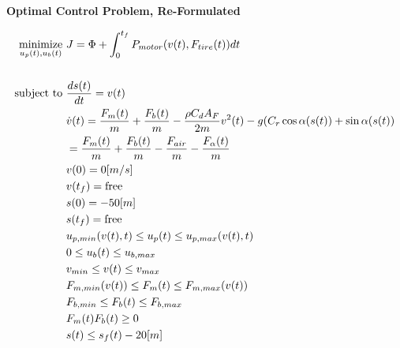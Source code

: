 \documentclass[a4paper]{article}
\begin{document}
\textbf{Optimal Control Problem, Re-Formulated}

\begin{align}
	\underset{u_p(t),u_b(t)}{\mbox{minimize}} \ & J = \Phi + \int_{0}^{t_f} P_{motor}(v(t),F_{tire}(t))dt \\ \\
	\mbox{subject to} \
	& {ds(t)\over dt} = v(t) \\
	& \dot{v}(t) = {F_m(t)\over m}+{F_b(t)\over m}-{\rho C_d A_F \over 2m}v^2(t) - g(C_r \cos{\alpha(s(t))} + \sin{\alpha(s(t)}) \\
	& = {F_m(t) \over m} + {F_b(t) \over m} - {F_{air} \over m} - {F_\alpha (t) \over m} \\
	& v(0) = 0[m/s] \\
	& v(t_f) = \text{free} \\
	& s(0) = -50[m] \\
	& s(t_f) = \text{free} \\
	& u_{p,min}(v(t),t) \le u_p(t) \le u_{p,max}(v(t),t) \\
	& 0 \le u_b(t) \le u_{b,max} \\
	& v_{min} \le v(t) \le v_{max} \\
	& F_{m,min}(v(t)) \le F_m(t) \le F_{m,max}(v(t)) \\
	& F_{b,min} \le F_b(t) \le F_{b,max} \\
	& F_m(t)F_b(t) \ge 0 \\
	& s(t) \le s_f(t) - 20 [m]
\end{align}
 



	
\end{document}
